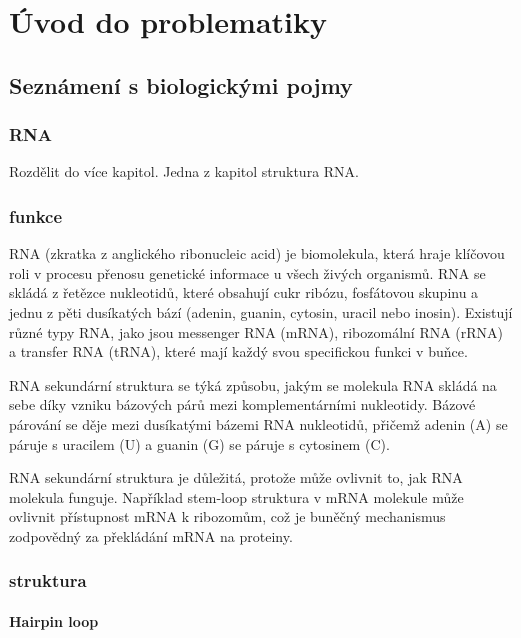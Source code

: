 
\chapter{Úvod do problematiky}

\section {Seznámení s biologickými pojmy}

\subsection{RNA} 

{\color{red}Rozdělit do více kapitol. Jedna z kapitol struktura RNA.}

\subsection{funkce}

RNA (zkratka z anglického ribonucleic acid) je biomolekula, která hraje
klíčovou roli v procesu přenosu genetické informace u všech živých organismů.
RNA se skládá z řetězce nukleotidů, které obsahují cukr ribózu, fosfátovou
skupinu a jednu z pěti dusíkatých bází (adenin, guanin, cytosin, uracil nebo
inosin). Existují různé typy RNA, jako jsou messenger RNA (mRNA), ribozomální
RNA (rRNA) a transfer RNA (tRNA), které mají každý svou specifickou funkci v
buňce.

RNA sekundární struktura se týká způsobu, jakým se molekula RNA skládá na sebe
díky vzniku bázových párů mezi komplementárními nukleotidy. Bázové párování se
děje mezi dusíkatými bázemi RNA nukleotidů, přičemž adenin (A) se páruje s
uracilem (U) a guanin (G) se páruje s cytosinem (C).

RNA sekundární struktura je důležitá, protože může ovlivnit to, jak RNA
molekula funguje. Například stem-loop struktura v mRNA molekule může ovlivnit
přístupnost mRNA k ribozomům, což je buněčný mechanismus zodpovědný za
překládání mRNA na proteiny.

\subsection{struktura}

\subsubsection{Hairpin loop}

